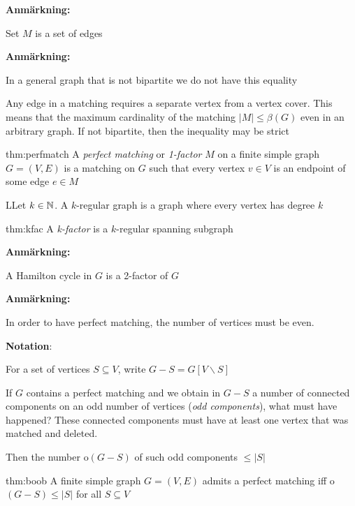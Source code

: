 \par\bigskip
\noindent\textbf{Anmärkning:}\par
\noindent Set $M$ is a set of edges
\par\bigskip
\noindent\textbf{Anmärkning:}\par
\noindent In a general graph that is not bipartite we do not have this equality\par
\noindent Any edge in a matching requires a separate vertex from a vertex cover. This means that the maximum cardinality of the matching $\left|M\right|\leq \beta(G)$  even in an arbitrary graph. If not bipartite, then the inequality may be strict
\par\bigskip
\begin{theo}{thm:perfmatch}
  A \textit{perfect matching} or \textit{1-factor} $M$ on a finite simple graph $G = (V,E)$ is a matching on $G$ such that every vertex $v\in V$ is an endpoint of some edge $e\in M$
\end{theo}
\par\bigskip
\begin{theo}
  LLet $k\in\mathbb{N}$. A $k$-regular graph is a graph where every vertex has degree $k$
\end{theo}
\par\bigskip
\begin{theo}[$k$-factor]{thm:kfac}
  A \textit{k-factor} is a $k$-regular spanning subgraph
\end{theo}
\par\bigskip
\noindent\textbf{Anmärkning:}\par
\noindent A Hamilton cycle in $G$ is a 2-factor of $G$
\par\bigskip
\noindent\textbf{Anmärkning:}\par
\noindent In order to have perfect matching, the number of vertices must be even.
\par\bigskip
\noindent\textbf{Notation}:\par
\noindent For a set of vertices $S\subseteq V$, write $G-S = G[V\backslash S]$\par
\noindent If $G$ contains a perfect matching and we obtain in $G-S$  a number of connected components on an odd number of vertices (\textit{odd components}), what must have happened? These connected components must have at least one vertex that was matched and deleted.\par
\noindent Then the number o$(G-S)$ of such odd components $\leq \left|S\right|$
\par\bigskip
\begin{theo}{thm:boob}
  A finite simple graph $G = (V,E)$ admits a perfect matching iff o$(G-S)\leq\left|S\right|$ for all $S\subseteq V$
\end{theo}
